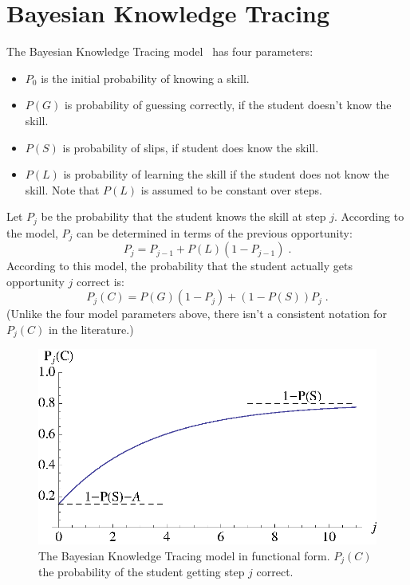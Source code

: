 \documentclass{acmlarge-edm}
\begin{document}
\section{Bayesian Knowledge Tracing}

The Bayesian Knowledge Tracing model~\cite{corbett_knowledge_1994} has four parameters:
%
\begin{itemize}
   \item $P_0$ is the initial probability of knowing a skill.
   \item $P(G)$ is probability of guessing correctly, if the student        
         doesn't know the skill.
   \item $P(S)$ is probability of slips, if student does know the skill.
   \item $P(L)$ is probability of learning the skill if the student 
         does not know the skill.  Note that $P(L)$ is assumed to 
         be constant over steps.
\end{itemize}
%
Let $P_j$ be the probability that the student knows the skill at 
step $j$. According to the model,  $P_j$ can
be determined in terms of the previous opportunity:
%
\begin{equation}
          P_j = P_{j-1} + P(L)\left(1-P_{j-1}\right)  \; . \label{recurse}
\end{equation}
%
According to this model, the probability that the student actually gets
opportunity $j$ correct is:
%
\begin{equation}
         P_j(C) = P(G)\left(1-P_j\right) + \left(1-P(S)\right) P_j \; . \label{pnc}
\end{equation}
%
(Unlike the four model parameters above, there isn't a consistent
notation for $P_j(C)$ in the literature.)

\begin{figure}
\centering\includegraphics{exponential.eps}
\caption{The Bayesian Knowledge Tracing model in functional form. 
          $P_j(C)$ the probability of  the student getting step $j$ correct.}
 \label{bktgraph}
\end{figure}
\end{document}

